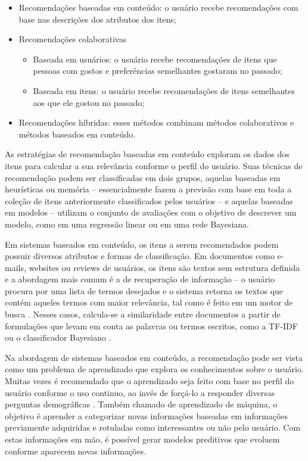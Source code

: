 \begin{itemize}
\item Recomendações baseadas em conteúdo: o usuário recebe recomendações com base nas descrições dos atributos dos itens; 
\item Recomendações colaborativas
\begin{itemize}
\item Baseada em usuários: o usuário recebe recomendações de itens que pessoas com gostos e preferências semelhantes gostaram no passado;
\item Baseada em itens: o usuário recebe recomendações de itens semelhantes aos que ele gostou no passado;
\end{itemize}
\item Recomendações híbridas: esses métodos combinam métodos colaborativos e métodos baseados em conteúdo.  
\end{itemize}

As estratégias de recomendação baseadas em conteúdo exploram os dados dos itens para calcular a sua relevância conforme o perfil do usuário. Suas técnicas de recomendação podem ser classificadas em dois grupos, aquelas baseadas em heurísticas ou memória -- essencialmente fazem a previsão com base em toda a coleção de itens anteriormente classificados pelos usuários -- e aquelas baseadas em modelos -- utilizam o conjunto de avaliações com o objetivo de descrever um modelo, como em uma regressão linear ou em uma rede Bayesiana. 

Em sistemas baseados em conteúdo, os itens a serem recomendados podem possuir diversos atributos e formas de classificação. Em documentos como e-mails, websites ou reviews de usuários, os itens são textos sem estrutura definida e a abordagem mais comum é a de recuperação de informação -- o usuário procura por uma lista de termos desejados e o sistema retorna os textos que contém aqueles termos com maior relevância, tal como é feito em um motor de busca \cite{schafer2001commerce}. Nesses casos, calcula-se a similaridade entre documentos a partir de formulações que levam em conta as palavras ou termos escritos, como a TF-IDF ou o classificador Bayesiano \cite{lops2011content-chap3}. 

Na abordagem de sistemas baseados em conteúdo, a recomendação pode ser vista como um problema de aprendizado que explora os conhecimentos sobre o usuário. Muitas vezes é recomendado que o aprendizado seja feito com base no perfil do usuário conforme o uso continuo, ao invés de forçá-lo a responder diversas perguntas demográficas \cite{wei2007survey}. Também chamado de aprendizado de máquina, o objetivo é aprender a categorizar novas informações baseadas em informações previamente adquiridas e rotuladas como interessantes ou não pelo usuário. Com estas informações em mão, é possível gerar modelos preditivos que evoluem conforme aparecem novas informações.


